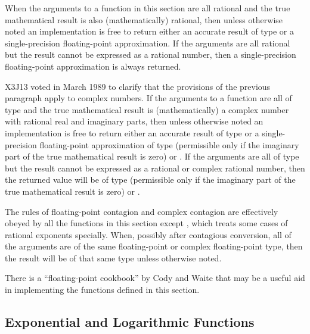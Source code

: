 When the arguments to
a function in this section are all rational and the true mathematical result
is also (mathematically) rational, then unless otherwise noted
an implementation is free to return either an accurate result of
type  or a single-precision floating-point approximation.
If the arguments are all rational but the result cannot be expressed
as a rational number, then a single-precision floating-point
approximation is always returned.

\begin{newer}
X3J13 voted in March 1989
to clarify that the provisions of the previous paragraph apply to complex
numbers.  If the arguments to a function are all of type
 and the true mathematical result
is (mathematically) a complex number with rational real
and imaginary parts, then unless otherwise noted
an implementation is free to return either an accurate result of
type 
or a single-precision floating-point approximation
of type  (permissible only if the imaginary part
of the true mathematical result is zero) or .
If the arguments are all of type
 but the result cannot be expressed
as a rational or complex rational number, then the returned value
will be of type  (permissible only if the imaginary part
of the true mathematical result is zero) or .
\end{newer}

The rules of floating-point contagion and complex contagion are 
effectively obeyed by all the functions in this section except ,
which treats some cases of rational exponents specially.
When, possibly after contagious conversion, all of the arguments are of
the same floating-point or complex floating-point type,
then the result will be of that same type unless otherwise noted.

\beforenoterule
\begin{implementation}
There is a ``floating-point cookbook'' by
Cody and Waite \cite{CODY-AND-WAITE} that may be a useful aid
in implementing the functions defined in this section.
\end{implementation}
\afternoterule

\subsection{Exponential and Logarithmic Functions}

